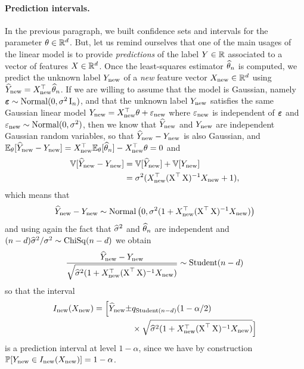 \paragraph{Prediction intervals.}

In the previous paragraph, we built confidence sets and intervals for the parameter $\theta \in \R^d$.
But, let us remind ourselves that one of the main usages of the linear model is to provide \emph{predictions} of the label $Y \in \R$ associated to a vector of features $X \in \R^d$.
Once the least-squares estimator $\wh \theta_n$ is computed, we predict the unknown label $Y_{\new}$ of a \emph{new}%
 feature vector $X_{\new} \in \R^d$ using $\wh Y_{\new} = X_{\new}^\top \wh \theta_n$.
If we are willing to assume that the model is Gaussian, namely $\beps \sim \nor(0, \sigma^2 \bI_n)$, and that the unknown label $Y_{\new}$ satisfies the same Gaussian linear model $Y_{\new} = X_{\new}^\top \theta + \eps_{\new}$ where $\eps_{\new}$ is independent of $\beps$ and
 $\eps_{\new} \sim \nor(0, \sigma^2)$, then we know that $\wh Y_{\new}$ and $Y_{\new}$ are independent Gaussian random variables, so that $\wh Y_{\new} - Y_{\new}$ is also Gaussian, and
 $\E_\theta[\wh Y_{\new} - Y_{\new}] = X_{\new}^\top \E_\theta[\wh \theta_n] - X_{\new}^\top \theta = 0$ and
 \begin{align*}
 	\var[\wh Y_{\new} - Y_{\new}] &= \var[\wh Y_{\new}] + \var[Y_{\new}] \\
 	&= \sigma^2 (X_{\new}^\top (\bX^\top \bX)^{-1} X_{\new} + 1),
 \end{align*}
which means that
\begin{equation*}
	\wh Y_{\new} - Y_{\new} \sim \nor\big(0, \sigma^2 (1 + X_{\new}^\top (\bX^\top \bX)^{-1} X_{\new})\big)
\end{equation*}
and using again the fact that $\wh \sigma^2$ and $\wh \theta_n$ are independent and $(n-d) \wh \sigma^2 / \sigma^2 \sim \chisq(n -d)$ we obtain
\begin{equation*}
	\frac{\wh Y_{\new} - Y_{\new}}{\sqrt{\wh \sigma^2  (1 + X_{\new}^\top (\bX^\top \bX)^{-1} X_{\new}) }} \sim \stu(n-d)
\end{equation*}
so that the interval
\begin{align*}
	I_{\new}(X_{\new}) = \Big[ \wh Y_{\new} \pm &q_{\stu(n-d)}(1 - \alpha / 2) \\
	& \times \sqrt{\wh \sigma^2  (1 + X_{\new}^\top (\bX^\top \bX)^{-1} X_{\new}) } \Big]
\end{align*}
is a prediction interval at level $1 - \alpha$, since we have by construction $\P[Y_{\new} \in I_{\new}(X_{\new})] = 1 - \alpha$.


